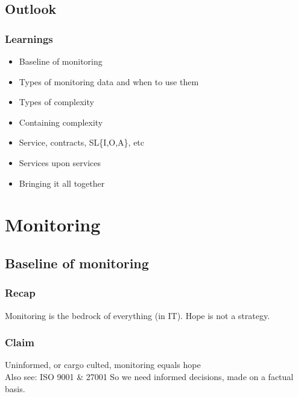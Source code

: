 \documentclass[t]{beamer}
\begin{document}
\subsection{Outlook}

\begin{frame}
	\frametitle{Learnings}
	\vfill
	\begin{itemize}

		\item Baseline of monitoring
		\item Types of monitoring data and when to use them

		\item Types of complexity
		\item Containing complexity

		\item Service, contracts, SL\{I,O,A\}, etc
		\item Services upon services

		\item Bringing it all together
	\end{itemize}
	\vfill
\end{frame}



\section{Monitoring}


\subsection{Baseline of monitoring}

\begin{frame}
	\frametitle{Recap}
	\begin{center}
		\vfill
		Monitoring is the bedrock of everything (in IT).
		\vfill
		Hope is not a strategy.
		\vfill
	\end{center}
\end{frame}

\begin{frame}
	\frametitle{Claim}
	\begin{center}
		\vfill
		Uninformed, or cargo culted, monitoring equals hope\\
		Also see: ISO 9001 \& 27001
		\vfill
		So we need informed decisions, made on a factual basis.
		\vfill
	\end{center}
\end{frame}
\end{document}
